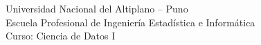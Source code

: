 \begin{center}
\large Universidad Nacional del Altiplano -- Puno\\
Escuela Profesional de Ingeniería Estadística e Informática\\
Curso: Ciencia de Datos I
\end{center}
\vspace{1em}
